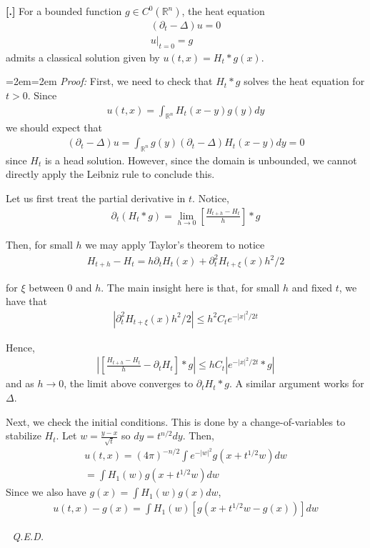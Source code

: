 \documentclass{article}
\newcommand{\R}{{\mathbb{R}}}
\newcommand{\pd}{\partial}
\newcounter{result}[section]
\newenvironment{res}[1][]{\refstepcounter{result}\par\medskip
	\noindent \textbf{[\thesection.\theresult] #1} \rmfamily}{\medskip}
\newenvironment{pf}{%
	\par%
	\medskip
	\leftskip=2em\rightskip=2em%
	\noindent\ignorespaces \textit{Proof:} \newline}{%
	\,\, \newline \textit{Q.E.D.}\par\medskip}
\begin{document}
	\begin{res}
		For a bounded function $g \in C^{0}(\R^{n})$, the heat equation 
		\begin{align*}
			\left(\pd_{t} - \Delta \right) u = 0 \\
			u|_{t=0} = g
		\end{align*}
		admits a classical solution given by $u(t,x) = H_{t} * g(x)$. 
	\end{res}
	
	\begin{pf}
		First, we need to check that $H_{t} * g$ solves the heat equation for $t>0$. Since
		\begin{align*}
			u(t,x) = \int_{\R^{n}} H_{t}(x-y)g(y) dy
		\end{align*}
		we should expect that 
		\begin{align*}
			(\pd_{t} - \Delta) u = \int_{\R^{n}} g(y)(\pd_{t} - \Delta )H_{t}(x-y) dy = 0
		\end{align*}
		since $H_{t}$ is a head solution. However, since the domain is unbounded, we cannot directly apply the Leibniz rule to conclude this. 
		
		
		Let us first treat the partial derivative in $t$. Notice, 
		\begin{align*}
			\pd_{t}( H_{t}*g) = \lim_{h \to 0} [\frac{H_{t+h}-H_{t}}{h}] * g
		\end{align*}
		
		Then, for small $h$ we may apply Taylor's theorem to notice 
		\begin{align*}
			H_{t+h} - H_{t} = h \pd_{t} H_{t}(x) + \pd_{t}^{2}H_{t+ \xi}(x)h^{2}/2
		\end{align*}
		
		for $\xi$ between $0$ and $h$. The main insight here is that, for small $h$ and fixed $t$, we have that 
		\begin{align*}
			|\pd_{t}^{2}H_{t+ \xi}(x)h^{2}/2| \leq h^{2} C_{t} e^{-|x|^{2}/2t}
		\end{align*}
		
		Hence, 
		\begin{align*}
			|[\frac{H_{t+h}-H_{t}}{h} - \pd_{t}H_{t}] * g| \leq hC_{t} | e^{-|x|^{2}/2t} * g|
		\end{align*}
		and as $h \to 0$, the limit above converges to $\pd_{t}H_{t} * g$. A similar argument works for $\Delta$. 
		
		
		
		
		Next, we check the initial conditions. This is done by a change-of-variables to stabilize $H_{t}$. Let $w = \frac{y-x}{\sqrt{t}}$ so $dy = t^{n/2} dy$. Then,
		\begin{align*}
			u(t,x) = (4\pi)^{-n/2} \int e^{-|w|^{2}} g(x+t^{1/2}w)dw \\
			= \int H_{1}(w) g(x+t^{1/2}w)dw
		\end{align*}
		Since we also have $g(x) = \int H_{1}(w)g(x)dw$,
		\begin{align*}
			u(t,x) - g(x) = \int H_{1}(w)\left[g(x+t^{1/2}w - g(x)) \right]dw
		\end{align*}
		

\end{pf}
\end{document}

